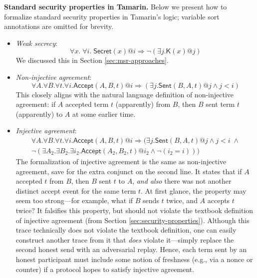 \documentclass{article}
\theoremstyle{definition}
\begin{document}
\textbf{Standard security properties in Tamarin.} Below we present how to formalize standard security properties in Tamarin's logic; variable sort annotations are omitted for brevity.
\begin{itemize}
    \item \emph{Weak secrecy}: $$\forall x. \; \forall i. \; \mathsf{Secret}(x) @i \Rightarrow \neg (\exists j. \mathsf{K}(x)@j)$$
    We discussed this in Section \ref{sec:msr-approaches}.
    \item \emph{Non-injective agreement}: $$\forall A. \forall B. \forall t. \forall i. \mathsf{Accept}(A,B,t)@i \Rightarrow (\exists j. \mathsf{Sent}(B,A,t)@j \land j < i)$$
    This closely aligns with the natural language definition of non-injective agreement: if $A$ accepted term $t$ (apparently) from $B$, then $B$ sent term $t$ (apparently) to $A$ at some earlier time.
    \item \emph{Injective agreement}: 
\begin{gather*}
    \forall A. \forall B. \forall t. \forall i. \mathsf{Accept}(A,B,t)@i \Rightarrow (\exists j. \mathsf{Sent}(B,A,t)@j \land j < i \;\land \\ 
    \neg (\exists A_2. \exists B_2. \exists i_2. \mathsf{Accept}(A_2,B_2,t)@i_2 \land \neg(i_2 = i) ))
\end{gather*}
The formalization of injective agreement is the same as non-injective agreement, 
save for the extra conjunct on the second line. 
It states that if $A$ accepted $t$ from $B$, then $B$ sent $t$ to $A$, 
\emph{and also} there was not another distinct accept event for the same term $t$. 
At first glance, the property may seem too strong---for example, 
what if $B$ sends $t$ twice, and $A$ accepts $t$ twice? 
It falsifies this property, but should not violate the textbook definition 
of injective agreement (from Section \ref{sec:security-properties}). 
Although this trace technically does not violate the textbook definition, 
one can easily construct another trace from it that \emph{does} violate it---simply replace the second honest send with an adversarial replay. Hence, each term sent by an honest participant must include some notion of freshness (e.g., via a nonce or counter) if a protocol hopes to satisfy injective agreement.
\end{itemize}
\end{document}
